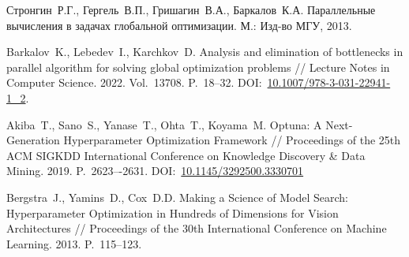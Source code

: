 \documentclass[11pt, oneside, a4paper]{article}
\begin{document}
\begin{biblio}
Стронгин~Р.Г., Гергель~В.П., Гришагин~В.А., Баркалов~К.А. Параллельные вычисления в задачах глобальной оптимизации. М.: Изд-во МГУ, 2013.


Barkalov~K., Lebedev~I., Karchkov~D. Analysis and elimination of bottlenecks in parallel algorithm for solving global optimization problems // Lecture Notes in Computer Science. 2022. Vol.~13708. P.~18--32. DOI:~\href{https://doi.org/10.1007/978-3-031-22941-1_2}{10.1007/978-3-031-22941-1\_2}.

Akiba~T., Sano~S., Yanase~T.,  Ohta~T., Koyama~M. Optuna: A Next-Generation Hyperparameter Optimization Framework // Proceedings of the 25th ACM SIGKDD International Conference on Knowledge Discovery \& Data Mining. 2019. P.~2623–-2631. DOI:~\href{https://dl.acm.org/doi/10.1145/3292500.3330701}{10.1145/3292500.3330701}

Bergstra~J., Yamins~D., Cox~D.D. Making a Science of Model Search: Hyperparameter Optimization in Hundreds of Dimensions for Vision Architectures // Proceedings of the 30th International Conference on Machine Learning. 2013. P.~115--123.









\end{biblio}
\end{document}
